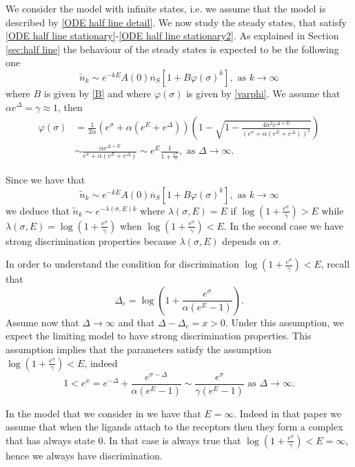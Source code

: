 \documentclass{article}
\numberwithin{equation}{section}
\theoremstyle{plain}
\begin{document}
We consider the model with infinite states, i.e. we assume that the model is described by \eqref{ODE half line detail}.
We now study the steady states, that satisfy \eqref{ODE half line stationary}-\eqref{ODE half line stationary2}. As explained in Section \ref{sec:half line} the behaviour of the steady states is expected to be the following one 
\[ 
\tilde{n}_k \sim  e^{- k E } A(0) \overline n_S \left[ 1 + B \varphi(\sigma)^k \right], \text{ as } k \to \infty 
\]
where $B $ is given by \eqref{B} and where $\varphi(\sigma) $ is given by \eqref{varphi}. 
We assume that $\alpha e^\Delta =\gamma\approx 1 $, then 
\begin{align*}
\varphi(\sigma)&= \frac{1}{2 \alpha } \left( e^\sigma + \alpha (e^E+ e^\Delta) \right)  \left( 1 - \sqrt{ 1- \frac{4 \alpha^2 e^{\Delta + E }}{(e^\sigma + \alpha (e^E+ e^\Delta) )^2 } } \right) \\
& \sim   \frac{ \alpha e^{\Delta + E }}{e^\sigma + \alpha (e^E+ e^\Delta)  }  \sim e^E \frac{1}{1 + \frac{e^\sigma}{\gamma} }, \text{ as } \Delta \to \infty. 
\end{align*}

Since we have that 
\[ 
\tilde{n}_k \sim  e^{- k E } A(0) \overline n_S \left[ 1 + B \varphi(\sigma)^k \right], \text{ as } k \to \infty 
\]
we deduce that $\tilde{n}_k \sim e^{-\lambda(\sigma, E) k } $ where $\lambda(\sigma, E) = E $ if $\log\left(1+ \frac{e^\sigma}{\gamma } \right)> E  $ while $ \lambda (\sigma, E) =  \log \left(1+ \frac{e^\sigma}{\gamma} \right) $ when $\log\left(1+ \frac{e^\sigma}{\gamma} \right)  < E $. In the second case we have strong discrimination properties because $\lambda (\sigma , E) $ depends on $\sigma$.



In order to understand the condition for discrimination $\log\left(1+ \frac{e^\sigma}{\gamma} \right)  < E $, recall that 
\[ \Delta_c = \log \left(1+ \frac{e^\sigma }{ \alpha (e^E-1) } \right) .
\]
Assume now that $\Delta \to \infty $ and that $\Delta - \Delta_c = x >0 $. Under this assumption, we expect the limiting model to have strong discrimination properties. 
This assumption implies that the parameters satisfy the assumption $\log\left(1+ \frac{e^\sigma}{\gamma} \right)  < E $, indeed
\[ 
1 < e^{x } = e^{ - \Delta} + \frac{e^{\sigma-\Delta} }{ \alpha (e^E-1) } \sim   \frac{e^{\sigma} }{ \gamma (e^E-1) } \text{ as } \Delta \to \infty. 
\]

In the model that we consider in \cite{franco2025stochastic} we have that $E=\infty$. Indeed in that paper we assume that when the ligands attach to the receptors then they form a complex that has always state $0. $
In that case is always true that $ \log \left( 1+ \frac{e^\sigma}{\gamma} \right)  < E=  \infty$, hence we always have discrimination. 
\end{document}
